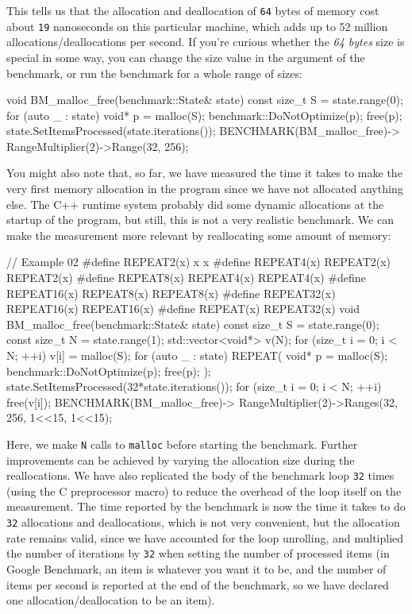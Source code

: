 This tells us that the allocation and deallocation of \texttt{64} bytes of memory cost about \texttt{19} nanoseconds on this particular machine, which adds up to 52 million allocations/deallocations per second. If you're curious whether the \emph{64 bytes} size is special in some way, you can change the size value in the argument of the benchmark, or run the benchmark for a whole range of sizes:

\begin{code}
void BM_malloc_free(benchmark::State& state) {
  const size_t S = state.range(0);
  for (auto _ : state) {
    void* p = malloc(S);
    benchmark::DoNotOptimize(p); free(p);
  }
  state.SetItemsProcessed(state.iterations());
}
BENCHMARK(BM_malloc_free)->
  RangeMultiplier(2)->Range(32,   256);
\end{code}

You might also note that, so far, we have measured the time it takes to make the very first memory allocation in the program since we have not allocated anything else. The C++ runtime system probably did some dynamic allocations at the startup of the program, but still, this is not a very realistic benchmark. We can make the measurement more relevant by reallocating some amount of memory:

\begin{code}
// Example 02
#define REPEAT2(x) x x
#define REPEAT4(x) REPEAT2(x) REPEAT2(x)
#define REPEAT8(x) REPEAT4(x) REPEAT4(x)
#define REPEAT16(x) REPEAT8(x) REPEAT8(x)
#define REPEAT32(x) REPEAT16(x) REPEAT16(x)
#define REPEAT(x) REPEAT32(x)
void BM_malloc_free(benchmark::State& state) {
  const size_t S = state.range(0);
  const size_t N = state.range(1);
  std::vector<void*> v(N);
  for (size_t i = 0; i < N; ++i) v[i] = malloc(S);
  for (auto _ : state) {
    REPEAT({
      void* p = malloc(S);
      benchmark::DoNotOptimize(p);
      free(p);
    });
  }
  state.SetItemsProcessed(32*state.iterations());
  for (size_t i = 0; i < N; ++i) free(v[i]);
}
BENCHMARK(BM_malloc_free)->
  RangeMultiplier(2)->Ranges({{32, 256}, {1<<15, 1<<15}});
\end{code}

Here, we make \texttt{N} calls to \texttt{malloc} before starting the benchmark. Further improvements can be achieved by varying the allocation size during the reallocations. We have also replicated the body of the benchmark loop \texttt{32} times (using the C preprocessor macro) to reduce the overhead of the loop itself on the measurement. The time reported by the benchmark is now the time it takes to do \texttt{32} allocations and deallocations, which is not very convenient, but the allocation rate remains valid, since we have accounted for the loop unrolling, and multiplied the number of iterations by \texttt{32} when setting the number of processed items (in Google Benchmark, an item is whatever you want it to be, and the number of items per second is reported at the end of the benchmark, so we have declared one allocation/deallocation to be an item).


